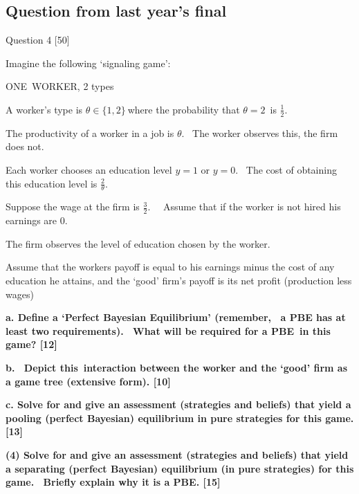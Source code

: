 \documentclass{article}
\begin{document}
\bigskip

\subsection{Question from last year's final}

{\Large Question 4 [50]}

Imagine the following `signaling game':

ONE\ WORKER, 2 types

A worker's type is $\theta \in \{1,2\}\ $where the probability that $\theta
=2$\ is $\frac{1}{2}$. \ 

The productivity of a worker in a job is $\theta $. \ The worker observes
this, the firm does not.

Each worker chooses an education level $y=1$ or $y=0$. \ The cost of
obtaining this education level is $\frac{2}{\theta }$.

Suppose the wage at the firm is $\frac{3}{2}$. \ \ Assume that if the worker
is not hired his earnings are $0$.

The firm observes the level of education chosen by the worker.

Assume that the workers payoff is equal to his earnings minus the cost of
any education he attains, and the `good' firm's payoff is its net profit
(production less wages)

\bigskip

\textbf{a. Define a `Perfect Bayesian Equilibrium' (remember, \qquad\ a PBE
has at least two requirements). \ What will be required for a PBE\ in this
game? [12]}

\bigskip

\textbf{b. \ Depict this\ interaction between the worker and the `good' firm
as a game tree (extensive form). [10]}

\textbf{c. Solve for and give an assessment (strategies and beliefs) that
yield a pooling (perfect Bayesian) equilibrium in pure strategies for this
game. [13]}

\bigskip

\textbf{(4) Solve for and give an assessment (strategies and beliefs) that
yield a separating (perfect Bayesian) equilibrium (in pure strategies) for
this game. \ Briefly explain why it is a PBE. [15]}
\end{document}
